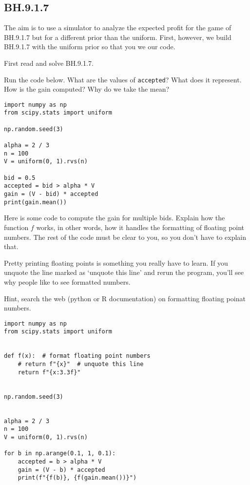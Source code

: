 \subsection{BH.9.1.7}

The aim is to use a simulator to analyze the expected profit for the game of BH.9.1.7 but for a different prior than the uniform.
First, however, we build BH.9.1.7 with the uniform prior so that you we our code.

First read and solve BH.9.1.7.

\begin{exercise}
Run the code below. What are the values of \verb|accepted|? What does it represent. How is the gain computed? Why do we take the mean?
\begin{verbatim}
import numpy as np
from scipy.stats import uniform

np.random.seed(3)

alpha = 2 / 3
n = 100
V = uniform(0, 1).rvs(n)

bid = 0.5
accepted = bid > alpha * V
gain = (V - bid) * accepted
print(gain.mean())
\end{verbatim}
\end{exercise}


\begin{exercise}
Here is some code to compute the gain for multiple bids. Explain how the function $f$ works, in other words, how it handles the  formatting of floating point numbers.
The rest of the code must be clear to you, so you don't have to explain that.

Pretty printing floating points is something you really have to learn. If you unquote the line marked as `unquote this line' and rerun the program, you'll see why people like to see formatted numbers.

Hint, search the web (python or R documentation) on formatting floating poinat numbers.
\begin{verbatim}
import numpy as np
from scipy.stats import uniform


def f(x):  # format floating point numbers
    # return f"{x}"  # unquote this line
    return f"{x:3.3f}"


np.random.seed(3)


alpha = 2 / 3
n = 100
V = uniform(0, 1).rvs(n)

for b in np.arange(0.1, 1, 0.1):
    accepted = b > alpha * V
    gain = (V - b) * accepted
    print(f"{f(b)}, {f(gain.mean())}")
\end{verbatim}
\end{exercise}


